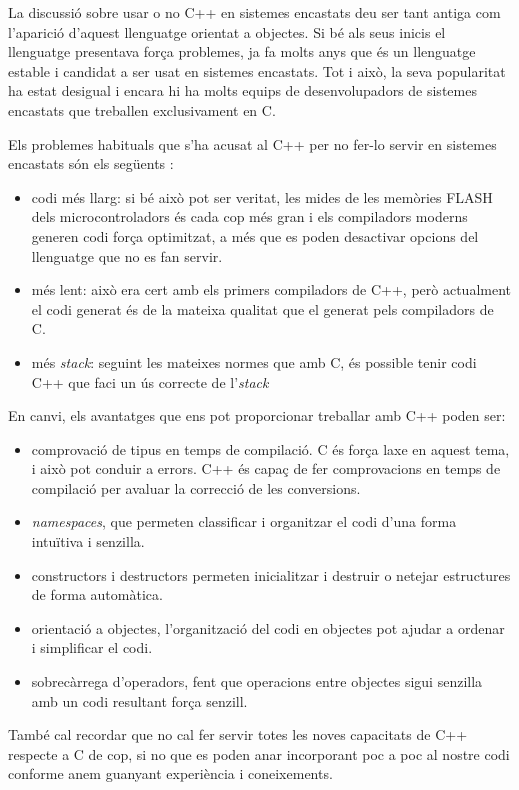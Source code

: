 La discussió sobre usar o no C++ en sistemes encastats deu ser tant antiga com l'aparició d'aquest llenguatge orientat a objectes. Si bé als seus inicis el llenguatge presentava força problemes, ja fa molts anys que és un llenguatge estable i candidat a ser usat en sistemes encastats. Tot i això, la seva popularitat ha estat desigual i encara hi ha molts equips de desenvolupadors de sistemes encastats que treballen exclusivament en C.

Els problemes habituals que s'ha acusat al C++ per no fer-lo servir en sistemes encastats són els següents \cite{CXX_1}:
\begin{itemize}
 \item codi més llarg: si bé això pot ser veritat, les mides de les memòries \gls{FLASH} dels microcontroladors és cada cop més gran i els compiladors moderns generen codi força optimitzat, a més que es poden desactivar opcions del llenguatge que no es fan servir.
 \item més lent: això era cert amb els primers compiladors de C++, però actualment el codi generat és de la mateixa qualitat que el generat pels compiladors de C.
 \item més {\em stack}: seguint les mateixes normes que amb C, és possible tenir codi C++ que faci un ús correcte de l'{\em stack}
\end{itemize}

En canvi, els avantatges que ens pot proporcionar treballar amb C++ poden ser:
\begin{itemize}
 \item comprovació de tipus en temps de compilació. C és força laxe en aquest tema, i això pot conduir a errors. C++ és capaç de fer comprovacions en temps de compilació per avaluar la correcció de les conversions.
 \item {\em namespaces}, que permeten classificar i organitzar el codi d'una forma intuïtiva i senzilla.
 \item constructors i destructors permeten inicialitzar i destruir o netejar estructures de forma automàtica.
 \item orientació a objectes, l'organització del codi en objectes pot ajudar a ordenar i simplificar el codi.
 \item sobrecàrrega d'operadors, fent que operacions entre objectes sigui senzilla amb un codi resultant força senzill.
\end{itemize}

També cal recordar que no cal fer servir totes les noves capacitats de C++ respecte a C de cop, si no que es poden anar incorporant poc a poc al nostre codi conforme anem guanyant experiència i coneixements.

